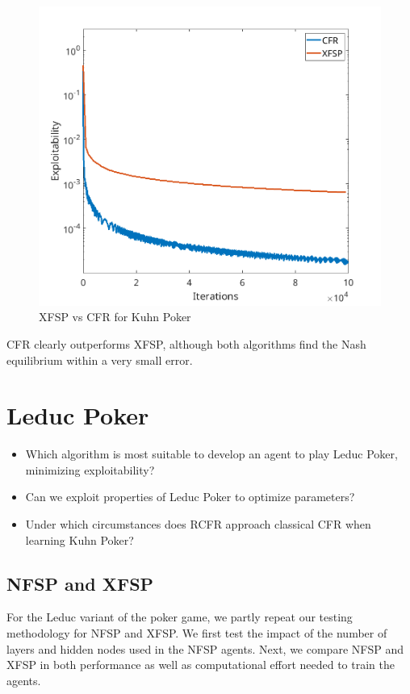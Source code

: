 \documentclass[10pt,a4paper]{article}
\begin{document}
\begin{figure}[h]
\centering
\includegraphics[scale=0.4]{Figures/cfr_vs_xfsp_kuhn.png}
\caption{XFSP vs CFR for Kuhn Poker}
\end{figure}

CFR clearly outperforms XFSP, although both algorithms find the Nash equilibrium within a very small error.



\section{Leduc Poker}
\begin{tcolorbox}
\begin{itemize}
\item{Which algorithm is most suitable to develop an agent to play Leduc Poker, minimizing exploitability?}
\item{Can we exploit properties of Leduc Poker to optimize parameters?}
\item{Under which circumstances does RCFR approach classical CFR when learning Kuhn Poker?}
\end{itemize}
\end{tcolorbox}
\subsection{NFSP and XFSP}
For the Leduc variant of the poker game, we partly repeat our testing methodology for NFSP and XFSP. We first test the impact of the number of layers and hidden nodes used in the NFSP agents. Next, we compare NFSP and XFSP in both performance as well as computational effort needed to train the agents.
 
\end{document}
